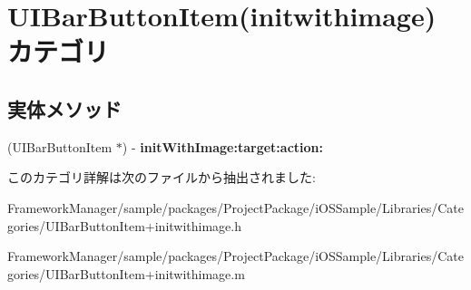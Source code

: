 \hypertarget{category_u_i_bar_button_item_07initwithimage_08}{}\section{U\+I\+Bar\+Button\+Item(initwithimage) カテゴリ}
\label{category_u_i_bar_button_item_07initwithimage_08}
\subsection*{実体メソッド}
\begin{DoxyCompactItemize}
\item 
\hypertarget{category_u_i_bar_button_item_07initwithimage_08_af198bf78a2f1e2e1bc2957faf19e793d}{}(U\+I\+Bar\+Button\+Item $\ast$) -\/ {\bfseries init\+With\+Image\+:target\+:action\+:}\label{category_u_i_bar_button_item_07initwithimage_08_af198bf78a2f1e2e1bc2957faf19e793d}

\end{DoxyCompactItemize}


このカテゴリ詳解は次のファイルから抽出されました\+:\begin{DoxyCompactItemize}
\item 
Framework\+Manager/sample/packages/\+Project\+Package/i\+O\+S\+Sample/\+Libraries/\+Categories/U\+I\+Bar\+Button\+Item+initwithimage.\+h\item 
Framework\+Manager/sample/packages/\+Project\+Package/i\+O\+S\+Sample/\+Libraries/\+Categories/U\+I\+Bar\+Button\+Item+initwithimage.\+m\end{DoxyCompactItemize}
